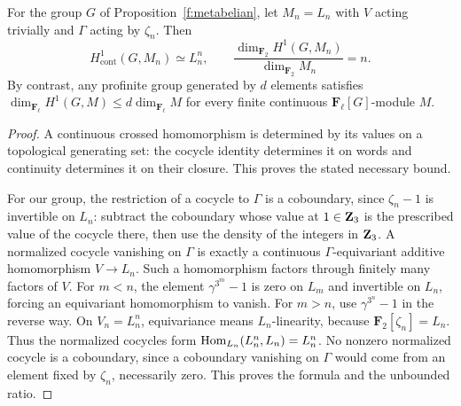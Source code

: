 \begin{corollary}
For the group $G$ of Proposition~\ref{f:metabelian}, let $M_n=L_n$
with $V$ acting trivially and $\Gamma$ acting by $\zeta_n$.
Then
\[
 H^1_{\mathrm{cont}}(G,M_n)\simeq L_n^n,
 \qquad
 \frac{\dim_{\mathbf F_2}H^1(G,M_n)}{\dim_{\mathbf F_2}M_n}=n.
\]
By contrast, any profinite group generated by $d$ elements satisfies
$\dim_{\mathbf F_\ell}H^1(G,M)\leq d\dim_{\mathbf F_\ell}M$
for every finite continuous $\mathbf F_\ell[G]$-module $M$.
\end{corollary}
\begin{proof}
A continuous crossed homomorphism is determined by its values on a
topological generating set: the cocycle identity determines it on
words and continuity determines it on their closure. This proves
the stated necessary bound.

For our group, the restriction of a cocycle to $\Gamma$ is a
coboundary, since $\zeta_n-1$ is invertible on $L_n$: subtract
the coboundary whose value at $1\in\mathbf Z_3$ is the prescribed
value of the cocycle there, then use the density of the integers
in $\mathbf Z_3$. A normalized cocycle vanishing on $\Gamma$ is exactly
a continuous $\Gamma$-equivariant additive homomorphism $V\to L_n$.
Such a homomorphism factors through finitely many factors of $V$.
For $m<n$, the element $\gamma^{3^m}-1$ is zero on $L_m$
and invertible on $L_n$, forcing an equivariant homomorphism to
vanish. For $m>n$, use $\gamma^{3^n}-1$ in the reverse way. On $V_n=L_n^n$,
equivariance means $L_n$-linearity, because
$\mathbf F_2[\zeta_n]=L_n$. Thus the normalized cocycles form
$\operatorname{Hom}_{L_n}(L_n^n,L_n)=L_n^n$. No nonzero normalized cocycle
is a coboundary, since a coboundary vanishing on $\Gamma$ would
come from an element fixed by $\zeta_n$, necessarily zero.
This proves the formula and the unbounded ratio.
\end{proof}

